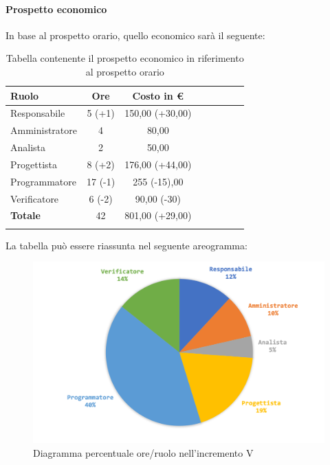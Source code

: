 			
		\paragraph{Prospetto economico}
			In base al prospetto orario, quello economico sarà il seguente: 
			
			\begin{longtable}{|l|c|c|c|c|c|c|c|}
				\hline
				\rowcolor{lighter-grayer}
				\textbf{Ruolo} & \textbf{Ore} & \textbf{Costo in €} \\
				\hline
				\endfirsthead
				\hline
				Responsabile 	    & 5 (+1) & 150,00 (+30,00)\\
				\hline 
				\hline
				Amministratore	  & 4 & 80,00\\
				\hline
				\hline
				Analista 				& 2 & 50,00\\
				\hline
				\hline
				Progettista 		  & 8 (+2) & 176,00 (+44,00)\\
				\hline
				\hline
				Programmatore 	 & 17 (-1)  & 255 (-15),00 \\
				\hline
				\hline
				Verificatore 		  & 6 (-2) & 90,00 (-30)\\
				\hline
				\textbf{Totale} 	&  42 & 801,00 (+29,00)\\
				\hline
					
				\caption{Tabella contenente il prospetto economico in riferimento al prospetto orario}
			\end{longtable}
			
			La tabella può essere riassunta nel seguente areogramma:
			\begin{figure}[H]
				\centering
				\includegraphics[width=0.8\linewidth]{images/consuntivo/ConsIncr5-2.png}
				\caption{Diagramma percentuale ore/ruolo nell'incremento V}
				\label{fig:consuntivo diagramma costi ruolo incremento V}
			\end{figure}

